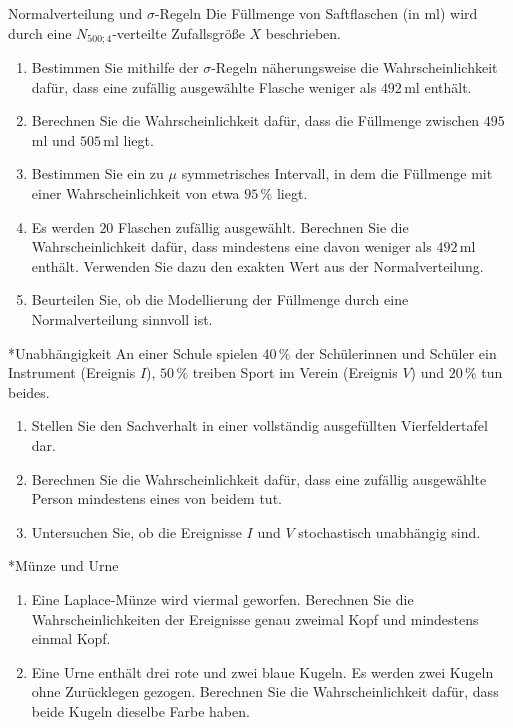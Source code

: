 \begin{uebung}{Normalverteilung und \texorpdfstring{\(\sigma\)}{Sigma}-Regeln}
Die Füllmenge von Saftflaschen (in ml) wird durch eine $N_{500;4}$-verteilte Zufallsgröße $X$ beschrieben.
\begin{enumerate}[label=\alph*)]
  \item Bestimmen Sie mithilfe der $\sigma$-Regeln näherungsweise die Wahrscheinlichkeit dafür, dass eine zufällig ausgewählte Flasche weniger als $492$\,ml enthält.
  \item Berechnen Sie die Wahrscheinlichkeit dafür, dass die Füllmenge zwischen $495$\,ml und $505$\,ml liegt.
  \item Bestimmen Sie ein zu $\mu$ symmetrisches Intervall, in dem die Füllmenge mit einer Wahrscheinlichkeit von etwa $95\,\%$ liegt.
  \item Es werden $20$ Flaschen zufällig ausgewählt. Berechnen Sie die Wahrscheinlichkeit dafür, dass mindestens eine davon weniger als $492$\,ml enthält. Verwenden Sie dazu den exakten Wert aus der Normalverteilung.
  \item Beurteilen Sie, ob die Modellierung der Füllmenge durch eine Normalverteilung sinnvoll ist.
\end{enumerate}
\end{uebung}


\begin{uebung}*{Unabhängigkeit}
An einer Schule spielen $40\,\%$ der Schülerinnen und Schüler ein Instrument (Ereignis $I$), $50\,\%$ treiben Sport im Verein (Ereignis $V$) und $20\,\%$ tun beides.
\begin{enumerate}[label=\alph*)]
  \item Stellen Sie den Sachverhalt in einer vollständig ausgefüllten Vierfeldertafel dar.
  \item Berechnen Sie die Wahrscheinlichkeit dafür, dass eine zufällig ausgewählte Person mindestens eines von beidem tut.
  \item Untersuchen Sie, ob die Ereignisse $I$ und $V$ stochastisch unabhängig sind.
\end{enumerate}
\end{uebung}

\begin{uebung}*{Münze und Urne}
\begin{enumerate}[label=\alph*)]
  \item Eine Laplace-Münze wird viermal geworfen. Berechnen Sie die Wahrscheinlichkeiten der Ereignisse \glqq genau zweimal Kopf\grqq{} und \glqq mindestens einmal Kopf\grqq.
  \item Eine Urne enthält drei rote und zwei blaue Kugeln. Es werden zwei Kugeln ohne Zurücklegen gezogen. Berechnen Sie die Wahrscheinlichkeit dafür, dass beide Kugeln dieselbe Farbe haben.
\end{enumerate}
\end{uebung}

